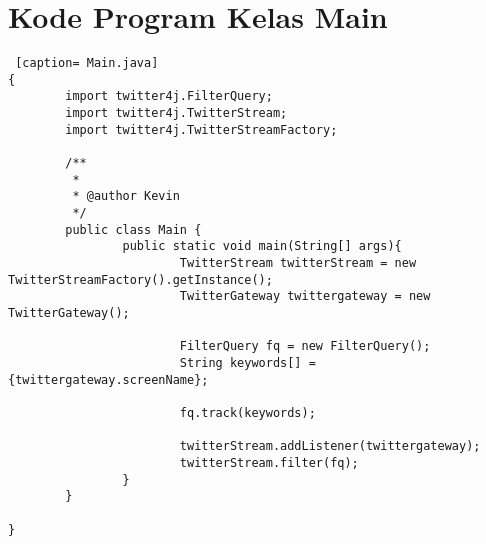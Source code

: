 \chapter{Kode Program Kelas Main}
\label{Kode Program Kelas Main}

\begin{lstlisting} [caption= Main.java]
{ 
		import twitter4j.FilterQuery;
		import twitter4j.TwitterStream;
		import twitter4j.TwitterStreamFactory;

		/**
		 *
		 * @author Kevin
		 */
		public class Main {
				public static void main(String[] args){
						TwitterStream twitterStream = new TwitterStreamFactory().getInstance();
						TwitterGateway twittergateway = new TwitterGateway();
						
						FilterQuery fq = new FilterQuery();
						String keywords[] = {twittergateway.screenName};

						fq.track(keywords);

						twitterStream.addListener(twittergateway);
						twitterStream.filter(fq);
				}
		}

}
\end{lstlisting}